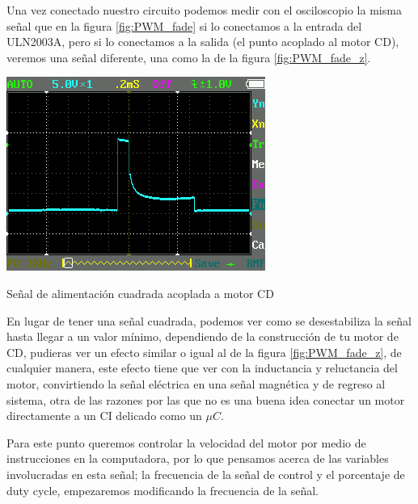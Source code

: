 		Una vez conectado nuestro circuito podemos medir con el osciloscopio la misma señal que en la figura \ref{fig:PWM_fade} si lo conectamos a la entrada del ULN2003A, pero si lo conectamos a la salida (el punto acoplado al motor CD), veremos una señal diferente, una como la de la figura \ref{fig:PWM_fade_z}.

		\begin{marginfigure}
			\begin{center}
				\includegraphics[width=\textwidth]{images/PWM_fade_z.png}
				\caption{Señal de alimentación cuadrada acoplada a motor CD}
				\label{fig:PWM_fade_z}
			\end{center}
		\end{marginfigure}

		En lugar de tener una señal cuadrada, podemos ver como se desestabiliza la señal hasta llegar a un valor mínimo, dependiendo de la construcción de tu motor de CD, pudieras ver un efecto similar o igual al de la figura \ref{fig:PWM_fade_z}, de cualquier manera, este efecto tiene que ver con la inductancia y reluctancia del motor, convirtiendo la señal eléctrica en una señal magnética y de regreso al sistema, otra de las razones por las que no es una buena idea conectar un motor directamente a un CI delicado como un $\mu C$.

		Para este punto queremos controlar la velocidad del motor por medio de instrucciones en la computadora, por lo que pensamos acerca de las variables involucradas en esta señal; la frecuencia de la señal de control y el porcentaje de duty cycle, empezaremos modificando la frecuencia de la señal.

